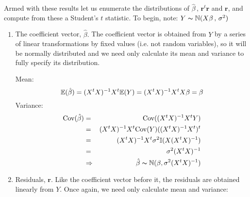 Armed with these results let us enumerate the distributions of $\hat{\beta}\,,\, \mathbf{r}^t\mathbf{r}$ and $ \mathbf{r}$, and compute from these a Student's $t$ statistic. To begin, note: $ Y \thicksim \mathbb{N}( X \beta \, ,\, \sigma^2)$
\begin{enumerate}

\item The coefficient vector, $\hat{\beta}.$
 \newline \newline The coefficient vector is obtained from $Y$ by a series of linear transformations by fixed values (i.e. not random variables), so it will be normally distributed and we need only calculate its mean and variance to fully specify its distribution.
 
  Mean: \begin{equation} \mathbb{E}( \hat{\beta})  =  (X^t X)^{-1} X^t \mathbb{E}(Y)  \\ = (X^t X)^{-1} X^t X \beta = \beta \end{equation}
Variance:
 \begin{eqnarray} \mbox{Cov}( \hat{\beta})  &=&   \mbox{Cov}((X^t X)^{-1} X^t Y) \nonumber \\  &=&   (X^t X)^{-1} X^t \mbox{Cov} (Y) ( (X^t X)^{-1} X^t)^t  \nonumber \\ &=&  (X^t X)^{-1} X^t \sigma^2\mathbb{I} (X (X^t X)^{-1})  \nonumber \\ &=& \sigma^2 (X^t X)^{-1} \\
& \Rightarrow & \hat{\beta} \thicksim \mathbb{N}(\beta, \sigma^2 (X^t X)^{-1} ) 
 \end{eqnarray} 
 \item Residuals, $\mathbf{r}$.
 \newline
 \newline
Like the coefficient vector before it, the residuals are obtained linearly from $Y$. Once again, we need only calculate mean and variance:
 

\end{enumerate}

